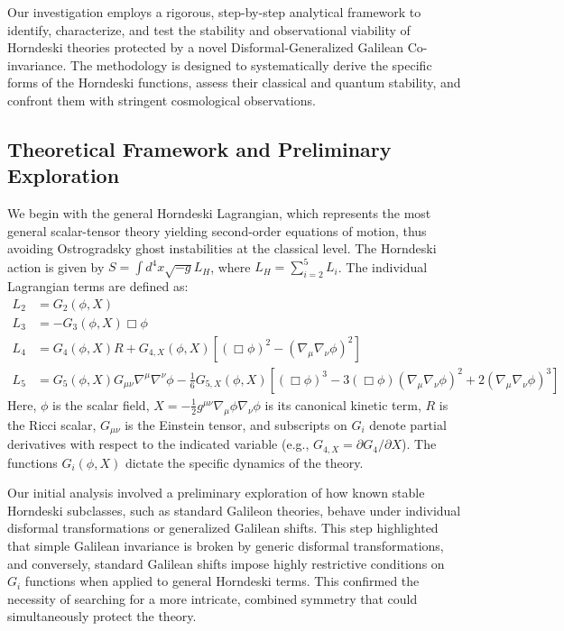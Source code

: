 \documentclass[twocolumn]{aastex631}
\begin{document}
Our investigation employs a rigorous, step-by-step analytical framework to identify, characterize, and test the stability and observational viability of Horndeski theories protected by a novel Disformal-Generalized Galilean Co-invariance. The methodology is designed to systematically derive the specific forms of the Horndeski functions, assess their classical and quantum stability, and confront them with stringent cosmological observations.

\subsection{Theoretical Framework and Preliminary Exploration}
We begin with the general Horndeski Lagrangian, which represents the most general scalar-tensor theory yielding second-order equations of motion, thus avoiding Ostrogradsky ghost instabilities at the classical level. The Horndeski action is given by $S = \int d^4x \sqrt{-g} L_H$, where $L_H = \sum_{i=2}^{5} L_i$. The individual Lagrangian terms are defined as:
\begin{align*}
L_2 &= G_2(\phi, X) \\
L_3 &= -G_3(\phi, X) \Box\phi \\
L_4 &= G_4(\phi, X) R + G_{4,X}(\phi, X) [(\Box\phi)^2 - (\nabla_\mu\nabla_\nu\phi)^2] \\
L_5 &= G_5(\phi, X) G_{\mu\nu} \nabla^\mu\nabla^\nu\phi - \frac{1}{6} G_{5,X}(\phi, X) [(\Box\phi)^3 - 3(\Box\phi)(\nabla_\mu\nabla_\nu\phi)^2 + 2(\nabla_\mu\nabla_\nu\phi)^3]
\end{align*}
Here, $\phi$ is the scalar field, $X = -\frac{1}{2}g^{\mu\nu}\nabla_\mu\phi\nabla_\nu\phi$ is its canonical kinetic term, $R$ is the Ricci scalar, $G_{\mu\nu}$ is the Einstein tensor, and subscripts on $G_i$ denote partial derivatives with respect to the indicated variable (e.g., $G_{4,X} = \partial G_4 / \partial X$). The functions $G_i(\phi, X)$ dictate the specific dynamics of the theory.

Our initial analysis involved a preliminary exploration of how known stable Horndeski subclasses, such as standard Galileon theories, behave under individual disformal transformations or generalized Galilean shifts. This step highlighted that simple Galilean invariance is broken by generic disformal transformations, and conversely, standard Galilean shifts impose highly restrictive conditions on $G_i$ functions when applied to general Horndeski terms. This confirmed the necessity of searching for a more intricate, combined symmetry that could simultaneously protect the theory.
\end{document}
